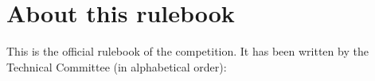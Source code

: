 
\section*{About this rulebook}
This is the official rulebook of the \RCAW competition.
It has been written by the \RCAW Technical Committee (in alphabetical order): 


